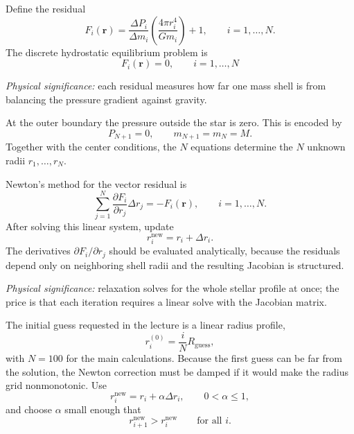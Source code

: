 Define the residual
\begin{equation}
    F_i(\mathbf{r})
    =
    \frac{\Delta P_i}{\Delta m_i}
    \left(\frac{4\pi r_i^4}{Gm_i}\right)
    +1,
    \qquad i=1,\ldots,N.
    \label{eq:lec07:relaxation-residual}
\end{equation}
The discrete hydrostatic equilibrium problem is
\begin{equation}
    \boxed{
    F_i(\mathbf{r})=0,
    \qquad i=1,\ldots,N}
    \label{eq:lec07:relaxation-system}
\end{equation}

\textit{Physical significance:} each residual measures how far one mass
shell is from balancing the pressure gradient against gravity.

At the outer boundary the pressure outside the star is zero. This is encoded
by
\begin{equation}
    P_{N+1}=0,
    \qquad
    m_{N+1}=m_N=M.
    \label{eq:lec07:surface-conditions}
\end{equation}
Together with the center conditions, the $N$ equations determine the
$N$ unknown radii $r_1,\ldots,r_N$.

Newton's method for the vector residual is
\begin{equation}
    \sum_{j=1}^{N}
    \frac{\partial F_i}{\partial r_j}\Delta r_j
    =-F_i(\mathbf{r}),
    \qquad i=1,\ldots,N.
    \label{eq:lec07:newton-linear-system}
\end{equation}
After solving this linear system, update
\begin{equation}
    r_i^{\mathrm{new}}=r_i+\Delta r_i.
    \label{eq:lec07:newton-radius-update}
\end{equation}
The derivatives $\partial F_i/\partial r_j$ should be evaluated
analytically, because the residuals depend only on neighboring shell radii
and the resulting Jacobian is structured.

\textit{Physical significance:} relaxation solves for the whole stellar
profile at once; the price is that each iteration requires a linear solve
with the Jacobian matrix.

The initial guess requested in the lecture is a linear radius profile,
\begin{equation}
    r_i^{(0)}=\frac{i}{N}R_{\mathrm{guess}},
    \label{eq:lec07:linear-radius-guess}
\end{equation}
with $N=100$ for the main calculations. Because the first guess can be far
from the solution, the Newton correction must be damped if it would make the
radius grid nonmonotonic. Use
\begin{equation}
    r_i^{\mathrm{new}}=r_i+\alpha\Delta r_i,
    \qquad
    0<\alpha\leq 1,
    \label{eq:lec07:damped-newton-update}
\end{equation}
and choose $\alpha$ small enough that
\begin{equation}
    r_{i+1}^{\mathrm{new}}>r_i^{\mathrm{new}}
    \qquad
    \text{for all } i.
    \label{eq:lec07:monotone-radius-condition}
\end{equation}

